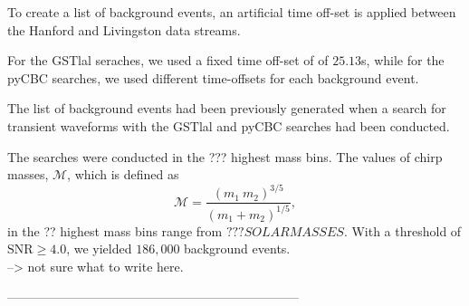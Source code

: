 \documentclass{article}
\begin{document}
   
  To create a list of background events, an artificial time off-set is applied between the Hanford and Livingston data streams.
  
  For the GSTlal seraches, we used a fixed time off-set of of $25.13$s, while for the pyCBC searches, we used different time-offsets for each background event. 
   

    
    The list of background events had been previously generated when a search for transient waveforms with the GSTlal and pyCBC searches had been conducted. 
    
    
    The searches were conducted in the ??? highest mass bins. The values of chirp masses, $\mathcal{M}$, which is defined as $$\mathcal{M} = \frac{(m_1 \ m_2)^{3/5}}{(m_1 + m_2)^{1/5}},$$ in the ?? highest mass bins range from $??? SOLAR MASSES$. With a threshold of $\text{SNR} \geq 4.0$, we yielded $186,000$ background events. \\ 
   
   
   --> not sure what to write here.
    
 

 
 
 
 
---------------------------------------------------------------------
 
 
 
 
\end{document}
